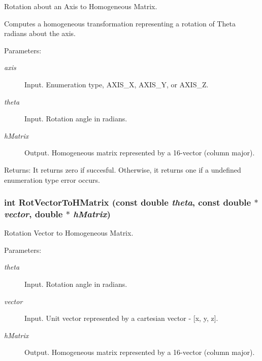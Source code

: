 Rotation about an Axis to Homogeneous Matrix. 

Computes a homogeneous transformation representing a rotation of Theta radians about the axis.

\begin{Desc}
\item[Parameters:]
\begin{description}
\item[{\em axis}]Input. Enumeration type, AXIS\_\-X, AXIS\_\-Y, or AXIS\_\-Z. \item[{\em theta}]Input. Rotation angle in radians. \item[{\em hMatrix}]Output. Homogeneous matrix represented by a 16-vector (column major).\end{description}
\end{Desc}
\begin{Desc}
\item[Returns:]It returns zero if succesful. Otherwise, it returns one if a undefined enumeration type error occurs. \end{Desc}
\hypertarget{group__homogeneous_ge57333c09ab072ba908b1bd7f75eb586}{
\subsubsection[RotVectorToHMatrix]{\setlength{\rightskip}{0pt plus 5cm}int RotVectorToHMatrix (const double {\em theta}, \/  const double $\ast$ {\em vector}, \/  double $\ast$ {\em hMatrix})}}
\label{group__homogeneous_ge57333c09ab072ba908b1bd7f75eb586}


Rotation Vector to Homogeneous Matrix. 

\begin{Desc}
\item[Parameters:]
\begin{description}
\item[{\em theta}]Input. Rotation angle in radians. \item[{\em vector}]Input. Unit vector represented by a cartesian vector - \mbox{[}x, y, z\mbox{]}. \item[{\em hMatrix}]Output. Homogeneous matrix represented by a 16-vector (column major). \end{description}
\end{Desc}
